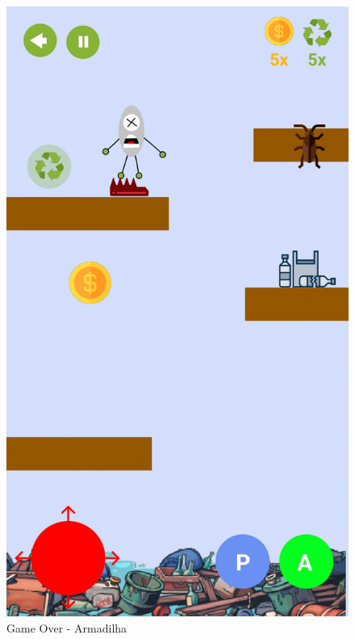 \documentclass[]{scrartcl}
\begin{document}
\begin{figure}[H]
	\begin{center}
		\includegraphics[scale=0.3]{figs/Game Design-01.png}
		\caption{Game Over - Armadilha}
	\end{center}
\end{figure}
\end{document}
